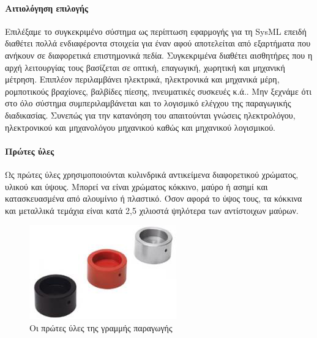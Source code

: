 \documentclass[a4paper,12pt,twoside]{report}
\begin{document}
{			\paragraph{Αιτιολόγηση επιλογής} {Επιλέξαμε το συγκεκριμένο σύστημα ως περίπτωση εφαρμογής για τη \acrshort{SysML} επειδή διαθέτει πολλά ενδιαφέροντα στοιχεία για έναν  αφού αποτελείται από εξαρτήματα που ανήκουν σε διαφορετικά επιστημονικά πεδία. Συγκεκριμένα διαθέτει αισθητήρες που η αρχή λειτουργίας τους βασίζεται σε οπτική, επαγωγική, χωρητική και μηχανική μέτρηση. Επιπλέον περιλαμβάνει ηλεκτρικά, ηλεκτρονικά και μηχανικά μέρη, ρομποτικούς βραχίονες, βαλβίδες πίεσης, πνευματικές συσκευές κ.ά.. Μην ξεχνάμε ότι στο όλο σύστημα συμπεριλαμβάνεται και το λογισμικό ελέγχου της παραγωγικής διαδικασίας. Συνεπώς για την κατανόηση του απαιτούνται γνώσεις ηλεκτρολόγου, ηλεκτρονικού και μηχανολόγου μηχανικού καθώς και μηχανικού λογισμικού.
			}
						
			\paragraph{Πρώτες ύλες} {Ως πρώτες ύλες χρησιμοποιούνται κυλινδρικά αντικείμενα διαφορετικού χρώματος, υλικού και ύψους. Μπορεί να είναι χρώματος κόκκινο, μαύρο ή ασημί και κατασκευασμένα από αλουμίνιο ή πλαστικό. Όσον αφορά το ύψος τους, τα κόκκινα και μεταλλικά τεμάχια είναι κατά 2,5 χιλιοστά ψηλότερα των αντίστοιχων μαύρων.
			}
			
			\begin{figure}[hp]
					\centering
					\includegraphics[scale=0.25]{WorkpiecesFesto.png}
					\caption{Οι πρώτες ύλες της γραμμής παραγωγής}
					\label{φωτ:Οι πρώτες ύλες της γραμμής παραγωγής}
			\end{figure}
		
}
\end{document}
